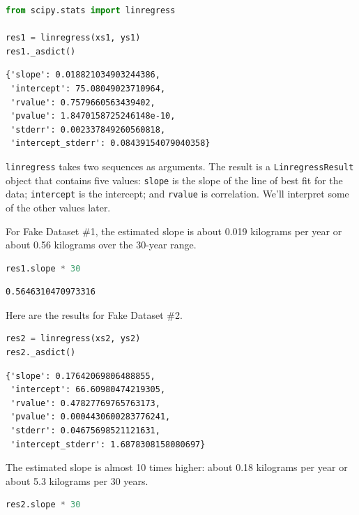 \begin{lstlisting}[language=Python,style=source]
from scipy.stats import linregress

res1 = linregress(xs1, ys1)
res1._asdict()
\end{lstlisting}

\begin{lstlisting}[style=output]
{'slope': 0.018821034903244386,
 'intercept': 75.08049023710964,
 'rvalue': 0.7579660563439402,
 'pvalue': 1.8470158725246148e-10,
 'stderr': 0.002337849260560818,
 'intercept_stderr': 0.08439154079040358}
\end{lstlisting}

\passthrough{\lstinline!linregress!} takes two sequences as arguments.
The result is a \passthrough{\lstinline!LinregressResult!} object that
contains five values: \passthrough{\lstinline!slope!} is the slope of
the line of best fit for the data; \passthrough{\lstinline!intercept!}
is the intercept; and \passthrough{\lstinline!rvalue!} is correlation.
We'll interpret some of the other values later.

For Fake Dataset \#1, the estimated slope is about 0.019 kilograms per
year or about 0.56 kilograms over the 30-year range.

\begin{lstlisting}[language=Python,style=source]
res1.slope * 30
\end{lstlisting}

\begin{lstlisting}[style=output]
0.5646310470973316
\end{lstlisting}

Here are the results for Fake Dataset \#2.

\begin{lstlisting}[language=Python,style=source]
res2 = linregress(xs2, ys2)
res2._asdict()
\end{lstlisting}

\begin{lstlisting}[style=output]
{'slope': 0.17642069806488855,
 'intercept': 66.60980474219305,
 'rvalue': 0.47827769765763173,
 'pvalue': 0.0004430600283776241,
 'stderr': 0.04675698521121631,
 'intercept_stderr': 1.6878308158080697}
\end{lstlisting}

The estimated slope is almost 10 times higher: about 0.18 kilograms per
year or about 5.3 kilograms per 30 years.

\begin{lstlisting}[language=Python,style=source]
res2.slope * 30
\end{lstlisting}

